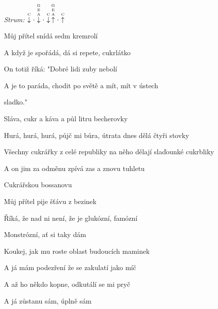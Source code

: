 \begin{song}


 \quad
\textit{Strum:} $\PluckDown{C}\Miss\PluckDown{G E A}\Miss\PluckDown{C}\PluckUp{G E A}\Miss\PluckUp{C}$

\large


\large

\bigskip

Můj přítel  snídá sedm kremrolí  \par
A když je spořádá, dá si repete, cukrlátko  \par
On totiž říká:  "Dobré lidi zuby nebolí  \par
A je to paráda, chodit po světě a mít, mít v ústech \par
{}sladko."    \par

\bigskip

\begin{chorusboxwide}{\Refren}
Sláva,  cukr a káva a půl litru becherovky \par
{}Hurá, hurá, hurá, půjč mi bůra, útrata dnes dělá čtyři stovky \par
Všechny cukrářky z celé  republiky na něho dělají slaďounké cukrbliky \par
A on jim za odměnu zpívá zas a znovu tuhletu  \par
Cukrářskou bossanovu    \par
\end{chorusboxwide}

\bigskip

Můj přítel  pije šťávu z bezinek  \par
Říká, že nad ni není, že je glukózní, famózní \par
{}Monstrózní, ať si taky dám \par
Koukej, jak mu roste  oblast budoucích maminek  \par
A já mám podezření že se zakulatí jako míč \par
A až ho někdo kopne, odkutálí se mi pryč \par
A já zůstanu sám,  úplně sám  \par


\end{song}
